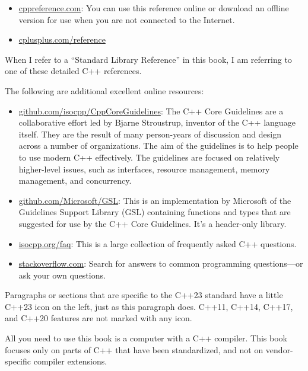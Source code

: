 \begin{itemize}
\item
\url{cppreference.com}: You can use this reference online or download an offline version for use when you are not connected to the Internet.

\item
\url{cplusplus.com/reference}
\end{itemize}

When I refer to a “Standard Library Reference” in this book, I am referring to one of these detailed C++ references.

The following are additional excellent online resources:

\begin{itemize}
\item
\url{github.com/isocpp/CppCoreGuidelines}: The C++ Core Guidelines are a collaborative effort led by Bjarne Stroustrup, inventor of the C++ language itself. They are the result of many person-years of discussion and design across a number of organizations. The aim of the guidelines is to help people to use modern C++ effectively. The guidelines are focused on relatively higher-level issues, such as interfaces, resource management, memory management, and concurrency.

\item
\url{github.com/Microsoft/GSL}: This is an implementation by Microsoft of the Guidelines Support Library (GSL) containing functions and types that are suggested for use by the C++ Core Guidelines. It’s a header-only library.

\item
\url{isocpp.org/faq}: This is a large collection of frequently asked C++ questions.

\item
\url{stackoverflow.com}: Search for answers to common programming questions—or ask your own questions.
\end{itemize}



Paragraphs or sections that are specific to the C++23 standard have a little C++23 icon on the left, just as this paragraph does. C++11, C++14, C++17, and C++20 features are not marked with any icon.


All you need to use this book is a computer with a C++ compiler. This book focuses only on parts of C++ that have been standardized, and not on vendor-specific compiler extensions.

